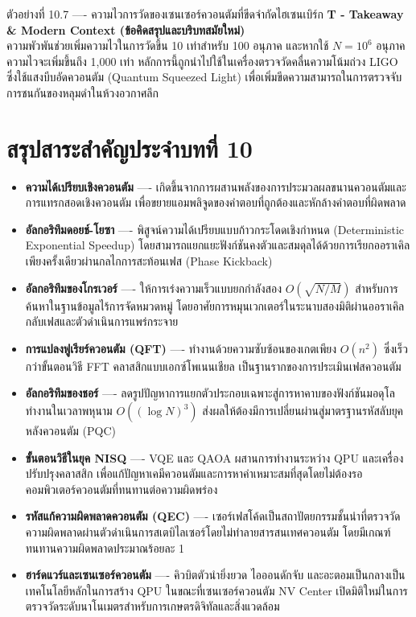 \begin{psctbox}{ตัวอย่างที่ 10.7 ---- ความไวการวัดของเซนเซอร์ควอนตัมที่ขีดจำกัดไฮเซนเบิร์ก}
\vspace{4pt}
\noindent\textbf{T - Takeaway \& Modern Context (ข้อคิดสรุปและบริบทสมัยใหม่)} \\
ความพัวพันช่วยเพิ่มความไวในการวัดขึ้น 10 เท่าสำหรับ 100 อนุภาค และหากใช้ $N = 10^6$ อนุภาค ความไวจะเพิ่มขึ้นถึง 1,000 เท่า หลักการนี้ถูกนำไปใช้ในเครื่องตรวจวัดคลื่นความโน้มถ่วง LIGO ซึ่งใช้แสงบีบอัดควอนตัม (Quantum Squeezed Light) เพื่อเพิ่มขีดความสามารถในการตรวจจับการชนกันของหลุมดำในห้วงอวกาศลึก
\end{psctbox}

\section{สรุปสาระสำคัญประจำบทที่ 10}

\begin{itemize}
    \item \textbf{ความได้เปรียบเชิงควอนตัม} ---- เกิดขึ้นจากการผสานพลังของการประมวลผลขนานควอนตัมและการแทรกสอดเชิงควอนตัม เพื่อขยายแอมพลิจูดของคำตอบที่ถูกต้องและหักล้างคำตอบที่ผิดพลาด
    \item \textbf{อัลกอริทึมดอยช์-โยซา} ---- พิสูจน์ความได้เปรียบแบบก้าวกระโดดเชิงกำหนด (Deterministic Exponential Speedup) โดยสามารถแยกแยะฟังก์ชันคงตัวและสมดุลได้ด้วยการเรียกออราเคิลเพียงครั้งเดียวผ่านกลไกการสะท้อนเฟส (Phase Kickback)
    \item \textbf{อัลกอริทึมของโกรเวอร์} ---- ให้การเร่งความเร็วแบบยกกำลังสอง $O(\sqrt{N/M})$ สำหรับการค้นหาในฐานข้อมูลไร้การจัดหมวดหมู่ โดยอาศัยการหมุนเวกเตอร์ในระนาบสองมิติผ่านออราเคิลกลับเฟสและตัวดำเนินการแพร่กระจาย
    \item \textbf{การแปลงฟูเรียร์ควอนตัม (QFT)} ---- ทำงานด้วยความซับซ้อนของเกตเพียง $O(n^2)$ ซึ่งเร็วกว่าขั้นตอนวิธี FFT คลาสสิกแบบเอกซ์โพเนนเชียล เป็นฐานรากของการประเมินเฟสควอนตัม
    \item \textbf{อัลกอริทึมของชอร์} ---- ลดรูปปัญหาการแยกตัวประกอบเฉพาะสู่การหาคาบของฟังก์ชันมอดุโล ทำงานในเวลาพหุนาม $O((\log N)^3)$ ส่งผลให้ต้องมีการเปลี่ยนผ่านสู่มาตรฐานรหัสลับยุคหลังควอนตัม (PQC)
    \item \textbf{ขั้นตอนวิธีในยุค NISQ} ---- VQE และ QAOA ผสานการทำงานระหว่าง QPU และเครื่องปรับปรุงคลาสสิก เพื่อแก้ปัญหาเคมีควอนตัมและการหาค่าเหมาะสมที่สุดโดยไม่ต้องรอคอมพิวเตอร์ควอนตัมที่ทนทานต่อความผิดพร่อง
    \item \textbf{รหัสแก้ความผิดพลาดควอนตัม (QEC)} ---- เซอร์เฟสโค้ดเป็นสถาปัตยกรรมชั้นนำที่ตรวจวัดความผิดพลาดผ่านตัวดำเนินการสเตบิไลเซอร์โดยไม่ทำลายสารสนเทศควอนตัม โดยมีเกณฑ์ทนทานความผิดพลาดประมาณร้อยละ 1
    \item \textbf{ฮาร์ดแวร์และเซนเซอร์ควอนตัม} ---- คิวบิตตัวนำยิ่งยวด ไอออนดักจับ และอะตอมเป็นกลางเป็นเทคโนโลยีหลักในการสร้าง QPU ในขณะที่เซนเซอร์ควอนตัม NV Center เปิดมิติใหม่ในการตรวจวัดระดับนาโนเมตรสำหรับการเกษตรดิจิทัลและสิ่งแวดล้อม
\end{itemize}


